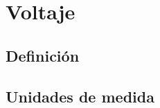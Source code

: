 \documentclass[../principal.tex]{subfiles}
\begin{document}

\chapter{Voltaje}

\section{Definición}

\section{Unidades de medida}
\end{document}
